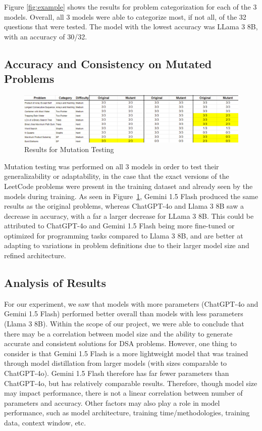 \documentclass[times, 10pt,twocolumn]{article}
\begin{document}
Figure \ref{fig:example} shows the results for problem categorization for each of the 3 models. Overall, all 3 models were able to categorize most, if not all, of the 32 questions that were tested. The model with the lowest accuracy was LLama 3 8B, with an accuracy of 30/32. 

\subsection{Accuracy and Consistency on Mutated Problems}

\begin{figure}[h]
    \centering
    \includegraphics[width=0.45
    \textwidth]{imgs/mutant-testing.png} %
    \caption{Results for Mutation Testing}
    \label{fig:mutation} %
\end{figure}

Mutation testing was performed on all 3 models in order to test their generalizability or adaptability, in the case that the exact versions of the LeetCode problems were present in the training dataset and already seen by the models during training. As seen in Figure~\ref{fig:mutation}, Gemini 1.5 Flash produced the same results as the original problems, whereas ChatGPT-4o and Llama 3 8B saw a decrease in accuracy, with a far a larger decrease for LLama 3 8B. This could be attributed to ChatGPT-4o and Gemini 1.5 Flash being more fine-tuned or optimized for programming tasks compared to Llama 3 8B, and are better at adapting to variations in problem definitions due to their larger model size and refined architecture. 


\subsection{Analysis of Results}
For our experiment, we saw that models with more parameters (ChatGPT-4o and Gemini 1.5 Flash) performed better overall than models with less parameters (Llama 3 8B). Within the scope of our project, we were able to conclude that there may be a correlation between model size and the ability to generate accurate and consistent solutions for DSA problems. However, one thing to consider is that Gemini 1.5 Flash is a more lightweight model that was trained through model distillation from larger models (with sizes comparable to ChatGPT-4o). Gemini 1.5 Flash therefore has far fewer parameters than ChatGPT-4o, but has relatively comparable results. Therefore, though model size may impact performance, there is not a linear correlation between number of parameters and accuracy. Other factors may also play a role in model performance, such as model architecture, training time/methodologies, training data, context window, etc. 
\end{document}
